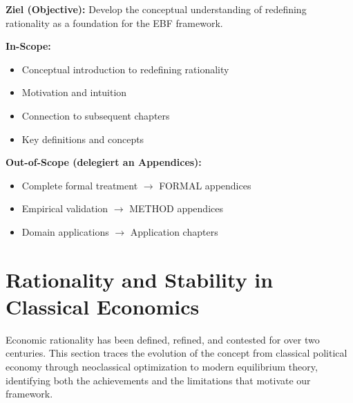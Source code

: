 \begin{tcolorbox}[
    colback=purple!5!white,
    colframe=purple!75!black,
    title={\textbf{Chapter Scope: Ziel / In-Scope / Out-of-Scope}},
    fonttitle=\bfseries
]

\textbf{Ziel (Objective):}
Develop the conceptual understanding of redefining rationality as a foundation for the EBF framework.

\vspace{0.3cm}
\textbf{In-Scope:}
\begin{itemize}[nosep]
    \item Conceptual introduction to redefining rationality
    \item Motivation and intuition
    \item Connection to subsequent chapters
    \item Key definitions and concepts
\end{itemize}

\vspace{0.3cm}
\textbf{Out-of-Scope (delegiert an Appendices):}
\begin{itemize}[nosep]
    \item Complete formal treatment $\rightarrow$ FORMAL appendices
    \item Empirical validation $\rightarrow$ METHOD appendices
    \item Domain applications $\rightarrow$ Application chapters
\end{itemize}

\end{tcolorbox}



\section{Rationality and Stability in Classical Economics}
\label{sec:classicalrationality}

Economic rationality has been defined, refined, and contested for over two centuries.
This section traces the evolution of the concept from classical political economy
through neoclassical optimization to modern equilibrium theory,
identifying both the achievements and the limitations that motivate our framework.

